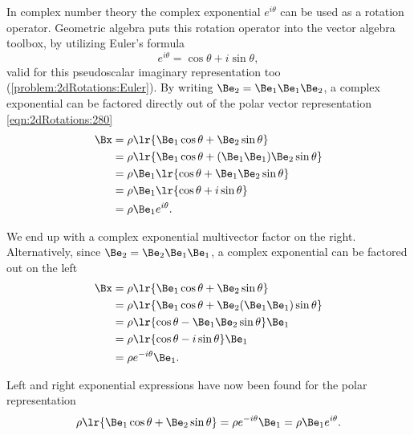 In complex number theory the complex exponential \( e^{i\theta} \) can be used as a rotation operator.
Geometric algebra puts this rotation operator into the vector algebra toolbox, by utilizing
Euler's formula
\begin{equation}\label{eqn:2dRotations:1140}
e^{i\theta} = \cos\theta + i \sin\theta,
\end{equation}
valid for this pseudoscalar imaginary representation too (\cref{problem:2dRotations:Euler}).
By writing \( \Be_2 = \Be_1 \Be_1 \Be_2 \),
a complex exponential can be factored directly out of the polar vector representation \cref{eqn:2dRotations:280}
\begin{equation}\label{eqn:2dRotations:940}
\begin{aligned}
\Bx
&= \rho \lr{ \Be_1 \cos\theta + \Be_2 \sin\theta } \\
&= \rho \lr{ \Be_1 \cos\theta + (\Be_1 \Be_1) \Be_2 \sin\theta } \\
&= \rho \Be_1 \lr{ \cos\theta + \Be_1 \Be_2 \sin\theta } \\
&= \rho \Be_1 \lr{ \cos\theta + i \sin\theta } \\
&= \rho \Be_1 e^{i\theta}.
\end{aligned}
\end{equation}

We end up with a complex exponential multivector factor on the right.
Alternatively, since \( \Be_2 = \Be_2 \Be_1 \Be_1 \), a complex exponential can be factored out on the left
\begin{equation}\label{eqn:2dRotations:960}
\begin{aligned}
\Bx &= \rho \lr{ \Be_1 \cos\theta + \Be_2 \sin\theta } \\
&= \rho \lr{ \Be_1 \cos\theta + \Be_2 (\Be_1 \Be_1) \sin\theta } \\
&= \rho \lr{ \cos\theta - \Be_1 \Be_2 \sin\theta } \Be_1 \\
&= \rho \lr{ \cos\theta - i \sin\theta } \Be_1 \\
&= \rho e^{-i\theta} \Be_1.
\end{aligned}
\end{equation}

Left and right exponential expressions have now been found for the polar representation
\begin{equation}\label{eqn:2dRotations:1120}
\rho \lr{ \Be_1 \cos\theta + \Be_2 \sin\theta }
= \rho e^{-i\theta} \Be_1 = \rho \Be_1 e^{i\theta}.
\end{equation}

